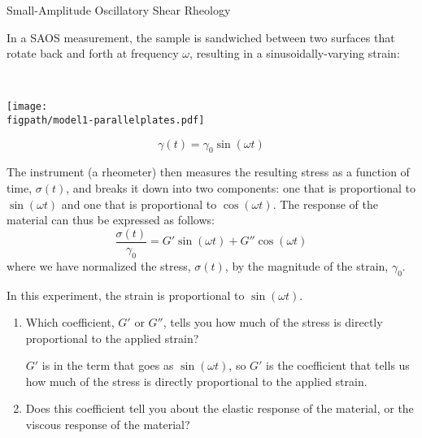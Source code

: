\begin{activity}[extension]{Small-Amplitude Oscillatory Shear Rheology}
\begin{model}
	In a SAOS measurement, the sample is sandwiched between two surfaces that rotate back and forth at frequency $\omega$, resulting in a sinusoidally-varying strain:
	
	\vspace{0.1in}
	\begin{minipage}{0.15\textwidth}
	~
	\end{minipage}
	\begin{minipage}{0.35\textwidth}
		\centerline{\texttt{[image: \\figpath/model1-parallelplates.pdf]}}
	\end{minipage}
	\begin{minipage}{0.4\textwidth}
		\begin{equation*}
			\gamma(t) = \gamma_0 \sin(\omega t)
		\end{equation*}
	\end{minipage}
	\vspace{0.1in}
	
	The instrument (a rheometer) then measures the resulting stress as a function of time, $\sigma(t)$, and breaks it down into two components: one that is proportional to $\sin(\omega t)$ and one that is proportional to $\cos(\omega t)$. The response of the material can thus be expressed as follows:
	\begin{equation*}
		\frac{\sigma(t)}{\gamma_0} = G' \sin(\omega t) + G'' \cos(\omega t)
	\end{equation*}
	where we have normalized the stress, $\sigma(t)$, by the magnitude of the strain, $\gamma_0$.

\end{model}

\begin{ctqs}
		
		\question In this experiment, the strain is proportional to $\sin(\omega t)$.  
			\begin{enumerate}
				\item Which coefficient, $G'$ or $G''$, tells you how much of the stress is directly proportional to the applied strain?
	
					\begin{solution}[1.1in]{}
						$G'$ is in the term that goes as $\sin(\omega t)$, so $G'$ is the coefficient that tells us how much of the stress is directly proportional to the applied strain.
					\end{solution}
		
		\item Does this coefficient tell you about the elastic response of the material, or the viscous response of the material?
	

\end{enumerate}
\end{ctqs}
\end{activity}

